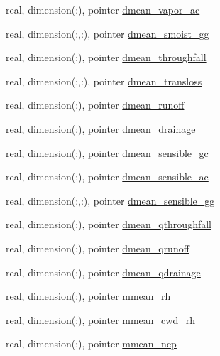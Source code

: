 \begin{DoxyCompactItemize}
\item 
real, dimension(\+:), pointer \hyperlink{structed__state__vars_1_1sitetype_afa358a2d2ed5347cfd6eb368fb6b27ad}{dmean\+\_\+vapor\+\_\+ac}
\item 
real, dimension(\+:,\+:), pointer \hyperlink{structed__state__vars_1_1sitetype_a6446ff00c3bc03bd175b15f341f0fdeb}{dmean\+\_\+smoist\+\_\+gg}
\item 
real, dimension(\+:), pointer \hyperlink{structed__state__vars_1_1sitetype_aa371357c8eed59509248cee6c66e6d99}{dmean\+\_\+throughfall}
\item 
real, dimension(\+:,\+:), pointer \hyperlink{structed__state__vars_1_1sitetype_af2a0010490ac32d376c740fa4baca548}{dmean\+\_\+transloss}
\item 
real, dimension(\+:), pointer \hyperlink{structed__state__vars_1_1sitetype_ae74562ecb0f52815d6bf748c19f3ac3e}{dmean\+\_\+runoff}
\item 
real, dimension(\+:), pointer \hyperlink{structed__state__vars_1_1sitetype_a518c1dbd99435ebee8b0b1d29146531c}{dmean\+\_\+drainage}
\item 
real, dimension(\+:), pointer \hyperlink{structed__state__vars_1_1sitetype_ae1048c6318cfc245afe39a2b768ab3ff}{dmean\+\_\+sensible\+\_\+gc}
\item 
real, dimension(\+:), pointer \hyperlink{structed__state__vars_1_1sitetype_a91ad53735ce664c738abb2a3419d515e}{dmean\+\_\+sensible\+\_\+ac}
\item 
real, dimension(\+:,\+:), pointer \hyperlink{structed__state__vars_1_1sitetype_adb4ea0fadc9bf632c2d610e0eb402084}{dmean\+\_\+sensible\+\_\+gg}
\item 
real, dimension(\+:), pointer \hyperlink{structed__state__vars_1_1sitetype_a5e43b9a15fcf1d268e8e7d802303855e}{dmean\+\_\+qthroughfall}
\item 
real, dimension(\+:), pointer \hyperlink{structed__state__vars_1_1sitetype_a43f97df5f9692af73ee8f5161c58781f}{dmean\+\_\+qrunoff}
\item 
real, dimension(\+:), pointer \hyperlink{structed__state__vars_1_1sitetype_adc8cc5e3cf86c22214751cb29507fea3}{dmean\+\_\+qdrainage}
\item 
real, dimension(\+:), pointer \hyperlink{structed__state__vars_1_1sitetype_a602632a05340e70bd2e2e0a48fc895ba}{mmean\+\_\+rh}
\item 
real, dimension(\+:), pointer \hyperlink{structed__state__vars_1_1sitetype_a86395bed3c9f7d7d0653fcf5798561f9}{mmean\+\_\+cwd\+\_\+rh}
\item 
real, dimension(\+:), pointer \hyperlink{structed__state__vars_1_1sitetype_a875e097f286d3e00959402dc35317092}{mmean\+\_\+nep}

\end{DoxyCompactItemize}
